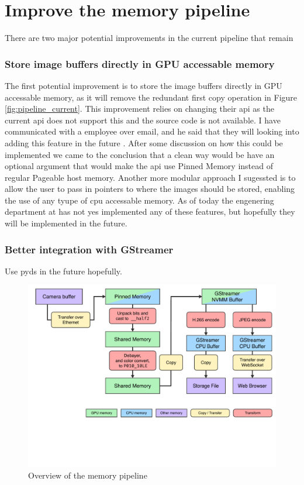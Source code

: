 \section{Improve the memory pipeline}
\label{sec:memory_pipeline_improvements}

There are two major potential improvements in the current pipeline that remain

\subsubsection{Store image buffers directly in GPU accessable memory}
The first potential improvement is to store the image buffers directly in GPU accessable memory, as it will remove the redundant first copy operation in Figure \ref{fig:pipeline_current}.
This improvement relies on \lucid changing their \gls{api} as the current \gls{api} does not support this and the source code is not available.
I have communicated with a \lucid employee over email, and he said that they will looking into adding this feature in the future \cite{martensRe17896Use2023}.
After some discussion on how this could be implemented we came to the conclusion that a clean way would be have an optional argument that would make the \gls{api} use Pinned Memory instead of regular Pageable host memory.
Another more modular approach I sugessted is to allow the user to pass in pointers to where the images should be stored, enabling the use of any tyupe of \gls{cpu} accessable memory.
As of today the engenering department at \lucid has not yes implemented any of these features, but hopefully they will be implemented in the future.

\subsubsection{Better integration with GStreamer}
Use \gls{pyds} in the future hopefully.

\begin{figure}[H]
    \centering
    \includegraphics[width=\textwidth]{figures/memory_pipeline/optimal.pdf}
    \caption{Overview of the memory pipeline}
    \label{fig:pipeline_optimal}
\end{figure}